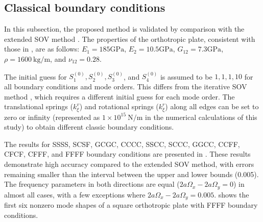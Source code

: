 \documentclass[preprint,12pt]{elsarticle}
\newcommand{\urho}{~\unit{\kilogram\per\meter}\xspace}
\newcommand{\ustif}{~\unit{\newton\per\metre}\xspace}
\newcommand{\nugpa}{\si{\giga\pascal}\xspace}
\begin{document}
\subsection{Classical boundary conditions}
In this subsection, the proposed method is validated by comparison with the extended SOV method \cite{xing2020extended}.  
The properties of the orthotropic plate, consistent with those in \cite{xing2020extended}, are as follows:  
\(E_1 = 185 \nugpa\), \(E_2 = 10.5 \nugpa\), \(G_{12} = 7.3 \nugpa\), \(\rho = 1600 \urho\), and \(\nu_{12} = 0.28\).

The initial guess for \(S^{(0)}_1, S^{(0)}_2, S^{(0)}_3\), and \(S^{(0)}_4\) is assumed to be \(1, 1, 1, 10\) for all boundary conditions and mode orders. This differs from the iterative SOV method \citealp{xing2018overall}, which requires a different initial guess for each mode order.  
The translational springs (\(k^v_\xi\)) and rotational springs (\(k^r_\xi\)) along all edges can be set to zero or infinity (represented as \(1 \times 10^{15} \ustif\) in the numerical calculations of this study) to obtain different classic boundary conditions.  

The results for SSSS, SCSF, GCGC, CCCC, SSCC, SCCC, GGCC, CCFF, CFCF, CFFF, and FFFF boundary conditions are presented in . These results demonstrate high accuracy compared to the extended SOV method, with errors remaining smaller than the interval between the upper and lower bounds (0.005). The frequency parameters in both directions are equal (\(2a\Omega_x - 2a\Omega_y = 0\)) in almost all cases, with a few exceptions where \(2a\Omega_x - 2a\Omega_y = 0.005\).  
 shows the first six nonzero mode shapes of a square orthotropic plate with FFFF boundary conditions.
\end{document}
